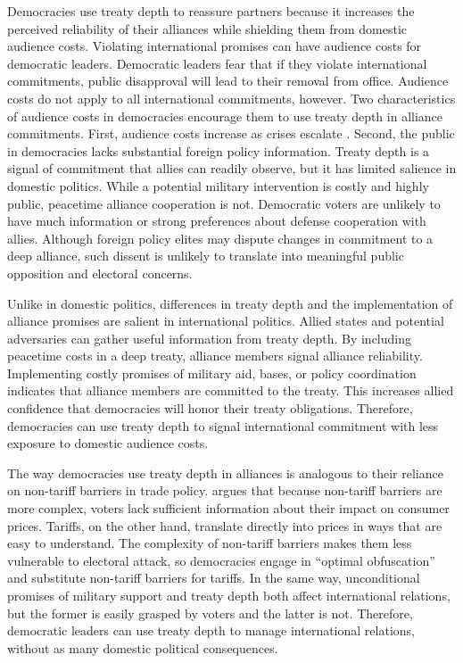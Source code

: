 \documentclass[12pt]{article}
\begin{document}
Democracies use treaty depth to reassure partners because it increases the perceived reliability of their alliances while shielding them from domestic audience costs. 
Violating international promises can have audience costs for democratic leaders.
Democratic leaders fear that if they violate international commitments, public disapproval will lead to their removal from office.  
Audience costs do not apply to all international commitments, however. 
Two characteristics of audience costs in democracies encourage them to use treaty depth in alliance commitments.  
First, audience costs increase as crises escalate \citep{Tomz2007}. 
Second, the public in democracies lacks substantial foreign policy information.
Treaty depth is a signal of commitment that allies can readily observe, but it has limited salience in domestic politics. 
While a potential military intervention is costly and highly public, peacetime alliance cooperation is not.  
Democratic voters are unlikely to have much information or strong preferences about defense cooperation with allies. 
Although foreign policy elites may dispute changes in commitment to a deep alliance, such dissent is unlikely to translate 
into meaningful public opposition and electoral concerns.


Unlike in domestic politics, differences in treaty depth and the implementation of alliance promises are salient in international politics. 
Allied states and potential adversaries can gather useful information from treaty depth. 
By including peacetime costs in a deep treaty, alliance members signal alliance reliability. 
Implementing costly promises of military aid, bases, or policy coordination indicates that alliance members are committed to the treaty. 
This increases allied confidence that democracies will honor their treaty obligations. 
Therefore, democracies can use treaty depth to signal international commitment with less exposure to domestic audience costs. 


The way democracies use treaty depth in alliances is analogous to their reliance on non-tariff barriers in trade policy.
\citet{Kono2006} argues that because non-tariff barriers are more complex, voters lack sufficient information about their impact on consumer prices.
Tariffs, on the other hand, translate directly into prices in ways that are easy to understand.
The complexity of non-tariff barriers makes them less vulnerable to electoral attack, so democracies engage in ``optimal obfuscation'' and substitute non-tariff barriers for tariffs. 
In the same way, unconditional promises of military support and treaty depth both affect international relations, but the former is easily grasped by voters and the latter is not. 
Therefore, democratic leaders can use treaty depth to manage international relations, without as many domestic political consequences.
\end{document}
